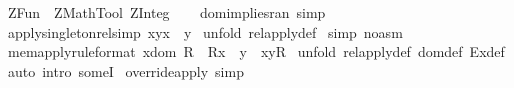%
\begin{isabellebody}%
\def\isabellecontext{ZFun}%
%
\isamarkuptrue%
%
\isadelimtheory
%
\endisadelimtheory
%
\isatagtheory
{}\isamarkupfalse%
\ ZFun\ \ ZMathTool\ ZInteg\ %
\endisatagtheory
{\isafoldtheory}%
%
\isadelimtheory
%
\endisadelimtheory
\ \isanewline
\isanewline
\isanewline
{}\isamarkupfalse%
\ dom{\isacharunderscore}implies{\isacharunderscore}ran\ {\isacharbrackleft}simp{\isacharbrackright}%
\isamarkuptrue%
\isamarkupfalse%
\ apply{\isacharunderscore}singleton{\isacharunderscore}rel{\isacharbrackleft}simp{\isacharbrackright}{\isacharcolon}\ {\isachardoublequoteopen}{\isacharparenleft}{\isacharbraceleft}{\isacharparenleft}x{\isacharcomma}y{\isacharparenright}{\isacharbraceright}{\isacharpercent}{\isacharcircum}x{\isacharparenright}\ {\isacharequal}\ y{\isachardoublequoteclose}\isanewline
%
\isadelimproof
%
\endisadelimproof
%
\isatagproof
{}\isamarkupfalse%
\ {\isacharparenleft}unfold\ rel{\isacharunderscore}apply{\isacharunderscore}def{\isacharparenright}\isanewline
{}\isamarkupfalse%
\ {\isacharparenleft}simp\ {\isacharparenleft}no{\isacharunderscore}asm{\isacharparenright}{\isacharparenright}\isanewline
{}\isamarkupfalse%
%
\endisatagproof
{\isafoldproof}%
%
\isadelimproof
\isanewline
%
\endisadelimproof
\isanewline
{}\isamarkupfalse%
\ mem{\isacharunderscore}apply{\isacharbrackleft}rule{\isacharunderscore}format{\isacharbrackright}{\isacharcolon}\ {\isachardoublequoteopen}x{\isacharcolon}dom\ R\ {\isacharampersand}\ {\isacharparenleft}R{\isacharpercent}{\isacharcircum}x{\isacharparenright}\ {\isacharequal}\ y\ {\isacharminus}{\isacharminus}{\isachargreater}\ {\isacharparenleft}x{\isacharcomma}y{\isacharparenright}{\isacharcolon}R{\isachardoublequoteclose}\isanewline
%
\isadelimproof
%
\endisadelimproof
%
\isatagproof
{}\isamarkupfalse%
\ {\isacharparenleft}unfold\ rel{\isacharunderscore}apply{\isacharunderscore}def\ dom{\isacharunderscore}def\ Ex{\isacharunderscore}def{\isacharparenright}\isanewline
{}\isamarkupfalse%
\ {\isacharparenleft}auto\ intro{\isacharcolon}\ someI{\isacharparenright}\isanewline
{}\isamarkupfalse%
%
\endisatagproof
{\isafoldproof}%
%
\isadelimproof
\isanewline
%
\endisadelimproof
\isanewline
{}\isamarkupfalse%
\ override{\isacharunderscore}apply\ {\isacharbrackleft}simp{\isacharbrackright}{\isacharcolon}\ \isanewline

\end{isabellebody}
